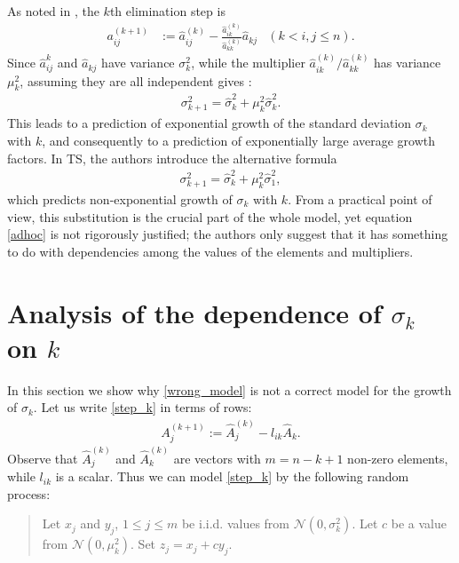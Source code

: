 \documentclass[12pt]{article}
\begin{document}
As noted in \cite[Section 5]{trefethen1990}, the $k$th elimination step is
\begin{align} \label{step_k}
    a_{ij}^{(k+1)} & := \hat{a}_{ij}^{(k)} - \frac{\hat{a}_{ik}^{(k)}}{\hat{a}_{kk}^{(k)}} \hat{a}_{kj}
        & (k<i, j\le n).
\end{align}
Since $\hat{a}_{ij}^k$ and $\hat{a}_{kj}$ have variance $\sigma_k^2$, while the
multiplier $\hat{a}_{ik}^{(k)}/\hat{a}_{kk}^{(k)}$ has variance $\mu_k^2$,
assuming they are all independent gives \cite[Equation (5.3)]{trefethen1990}:
\begin{align} \label{wrong_model}
    \sigma_{k+1}^2 = \hat{\sigma}_k^2 + \mu_k^2 \hat{\sigma}_k^2.
\end{align}
This leads to a prediction of exponential growth of the standard deviation $\sigma_k$
with $k$, and consequently to a prediction of exponentially large average growth factors.
In TS, the authors introduce the alternative formula
\begin{align} \label{adhoc}
    \sigma_{k+1}^2 = \hat{\sigma}_k^2 + \mu_k^2 \hat{\sigma}_1^2,
\end{align}
which predicts non-exponential growth of $\sigma_k$ with $k$.  
From a practical point of view, this substitution is the crucial part of the whole model, yet
equation \eqref{adhoc} is not rigorously justified; the authors only suggest
that it has something to do with dependencies among the values of the elements and
multipliers.

\section{Analysis of the dependence of $\sigma_k$ on $k$}
In this section we show why \eqref{wrong_model} is not a correct model
for the growth of $\sigma_k$.  
Let us write \eqref{step_k} in terms of rows:
\begin{align}
A_j^{(k+1)} := \hat{A}_j^{(k)} - l_{ik} \hat{A}_k.
\end{align}
Observe that $\hat{A}_j^{(k)}$ and $\hat{A}_k^{(k)}$ are vectors with $m=n-k+1$
non-zero elements, while $l_{ik}$ is a scalar.  Thus we can model \eqref{step_k}
by the following random process:

\begin{quote}
Let $x_j$ and $y_j$, $1\le j \le m$ be i.i.d. values from ${\mathcal N}(0,\sigma^2_k)$.
Let $c$ be a value from ${\mathcal N}(0,\mu^2_k)$.  Set $z_j = x_j + cy_j$.
\end{quote}
\end{document}
